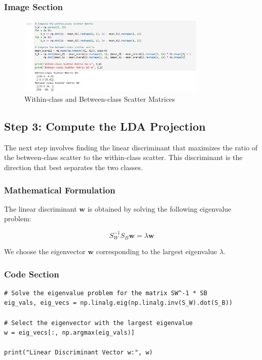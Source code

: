 \documentclass{exam}
\begin{document}
\subsubsection*{Image Section}

\begin{figure}[h!]
    \centering
    \includegraphics[width=0.8\textwidth]{images/scatter_matrices.png}
    \caption{Within-class and Between-class Scatter Matrices}
    \label{fig:scatter_matrices}
\end{figure}

\newpage

\subsection{Step 3: Compute the LDA Projection}

The next step involves finding the linear discriminant that maximizes the ratio of the between-class scatter to the within-class scatter. This discriminant is the direction that best separates the two classes.

\subsubsection*{Mathematical Formulation}

The linear discriminant \( \mathbf{w} \) is obtained by solving the following eigenvalue problem:

\[
S_W^{-1} S_B \mathbf{w} = \lambda \mathbf{w}
\]

We choose the eigenvector \( \mathbf{w} \) corresponding to the largest eigenvalue \( \lambda \).

\subsubsection*{Code Section}

\begin{verbatim}
# Solve the eigenvalue problem for the matrix SW^-1 * SB
eig_vals, eig_vecs = np.linalg.eig(np.linalg.inv(S_W).dot(S_B))

# Select the eigenvector with the largest eigenvalue
w = eig_vecs[:, np.argmax(eig_vals)]

print("Linear Discriminant Vector w:", w)
\end{verbatim}
\end{document}

